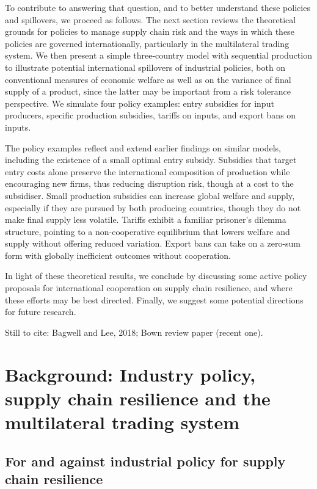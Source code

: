 \documentclass{article}
\begin{document}
To contribute to answering that question, and to better understand these policies and spillovers, we proceed as follows. The next section reviews the theoretical grounds for policies to manage supply chain risk and the ways in which these policies are governed internationally, particularly in the multilateral trading system. We then present a simple three-country model with sequential production to illustrate potential international spillovers of industrial policies, both on conventional measures of economic welfare as well as on the variance of final supply of a product, since the latter may be important from a risk tolerance perspective. We simulate four policy examples: entry subsidies for input producers, specific production subsidies, tariffs on inputs, and export bans on inputs. 

The policy examples reflect and extend earlier findings on similar models, including the existence of a small optimal entry subsidy. Subsidies that target entry costs alone preserve the international composition of production while encouraging new firms, thus reducing disruption risk, though at a cost to the subsidiser. Small production subsidies can increase global welfare and supply, especially if they are pursued by both producing countries, though they do not make final supply less volatile. Tariffs exhibit a familiar prisoner's dilemma structure, pointing to a non-cooperative equilibrium that lowers welfare and supply without offering reduced variation. Export bans can take on a zero-sum form with globally inefficient outcomes without cooperation.

In light of these theoretical results, we conclude by discussing some active policy proposals for international cooperation on supply chain resilience, and where these efforts may be best directed. Finally, we suggest some potential directions for future research.

Still to cite: Bagwell and Lee, 2018; Bown review paper (recent one).

\section{Background: Industry policy, supply chain resilience and the multilateral trading system}

\subsection{For and against industrial policy for supply chain resilience}
\end{document}
